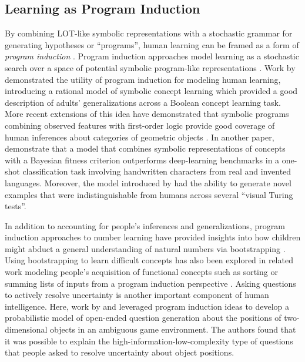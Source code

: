\documentclass[doc,natbib,floatsintext]{apa7}
\begin{document}
\subsection{Learning as Program Induction}
By combining LOT-like symbolic representations with a stochastic grammar for generating hypotheses or ``programs'', human learning can be framed as a form of \textit{program induction} \citep{chater2013programs, calvo2014architecture, lake2017building,romano2018bayesian, rothe2017question, piantadosi2016logical,bramley2018grounding,rule2018learning}. Program induction approaches model learning as a stochastic search over a space of potential symbolic program-like representations \citep{rule2020child}. Work by \cite{goodman2008rational} demonstrated the utility of program induction for modeling human learning, introducing a rational model of symbolic concept learning which provided a good description of adults' generalizations across a Boolean concept learning task. More recent extensions of this idea have demonstrated that symbolic programs combining observed features with first-order logic provide good coverage of human inferences about categories of geometric objects \citep{piantadosi2016logical}. In another paper, \cite{lake2015human} demonstrate that a model that combines symbolic representations of concepts with a Bayesian fitness criterion outperforms deep-learning benchmarks in a one-shot classification task involving handwritten characters from real and invented languages. Moreover, the model introduced by \cite{lake2015human} had the ability to generate novel examples that were indistinguishable from humans across several ``visual Turing tests''.    

In addition to accounting for people's inferences and generalizations, program induction approaches to number learning have provided insights into how children might abduct a general understanding of natural numbers via bootstrapping \citep{piantadosi2012bootstrapping}. Using bootstrapping to learn difficult concepts has also been explored in related work modeling people's acquisition of functional concepts such as sorting or summing lists of inputs from a program induction perspective \citep{rule2018learning}. Asking questions to actively resolve uncertainty is another important component of human intelligence. Here, work by \cite{rothe2017question} and \cite{wang2019modeling} leveraged program induction ideas to develop a probabilistic model of open-ended question generation about the positions of two-dimensional objects in an ambiguous game environment. The authors found that it was possible to explain the high-information-low-complexity type of questions that people asked to resolve uncertainty about object positions.
\end{document}
